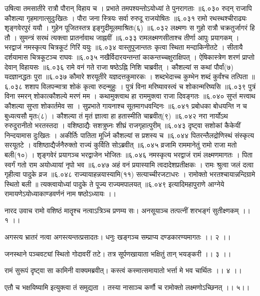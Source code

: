 उषित्वा तमसातीरे रात्रौ पौरान् विहाय च ।
प्रभाते तमपश्यन्तोऽयोध्यां ते पुनरागताः ॥६.०३०
रुदन् राजापि कौशल्या गृहमागात्सुदुःखितः ।
पौरा जना स्त्रियः सर्वा रुरुदू राजयोषितः ॥६.०३१
रामो रथस्थश्चीराढ्यः शृङ्गवेरपुरं ययौ ।
गुहेन पूजितस्तत्र इङ्गुदीमूलमाश्रितः(६) ॥६.०३२
लक्ष्मणः स गुहो रात्रौ चक्रतुर्जागरं हि तौ ।
सुमन्त्रं सरथं त्यक्त्वा प्रातर्नावाथ जाह्नवीं ॥६.०३३
रामलक्ष्मणसीताश्च तीर्णा आपुः प्रयागकम् ।
भरद्वाजं नमस्कृत्य चित्रकूटं गिरिं ययुः ॥६.०३४
वास्तुपूजान्ततः कृत्वा स्थिता मन्दाकिनीतटे ।
सीतायै दर्शयामास चित्रकूटञ्च राघवः ॥६.०३५
नखैर्विदारयन्तन्तां काकन्तच्चक्षुराक्षिपत् ।
ऐषिकास्त्रेण शरणं प्राप्तो देवान् विहायसः ॥६.०३६
रामे वनं गते राजा षष्ठेऽह्नि निशि चाब्रवीत् ।
कौशल्यां स कथां पौर्वां(७) यदज्ञानद्धतः पुरा ॥६.०३७
कौमारे शरयूतीरे यज्ञदत्तकुमारकः ।
शब्दभेदाच्च कुम्भेन शब्दं कुर्वंश्च तत्पिता ॥६.०३८
शशाप विलपन्मात्रा शोकं कृत्वा रुदन्मुहुः ।
पुत्रं विना मरिष्यावस्त्वं च शोकान्मरिष्यसि ॥६.०३९
पुत्रं विना स्मरन् शोकात्कौशल्ये मरणं मम ।
कथामुक्त्वाथ हा राममुक्त्वा राजा दिवङ्गतः ॥६.०४०
सुप्तं मत्त्वाथ कौशल्या सुप्ता शोकार्तमेव सा ।
सुप्रभाते गायनाश्च सूतमागधवन्दिनः ॥६.०४१
प्रबोधका बोधयन्ति न च बुध्यत्यसौ मृतः(८) ।
कौशल्या तं मृतं ज्ञात्वा हा हतास्मीति चाब्रवीत्(९) ॥६.०४२
नरा नार्योऽथ रुरुदुरानीतो भरतस्तदा ।
वशिष्ठाद्यैः सशत्रुघ्नः शीघ्रं राजगृहात्पुरीम् ॥६.०४३
दृष्ट्वा सशोकां कैकेयीं निन्दयामास दुःखितः ।
अकीर्तिः पातिता मूर्ध्नि कौशल्यां स प्रशस्य च ॥६.०४४
पितरन्तैलद्रोणिस्थं संस्कृत्य सरयूतटे ।
वशिष्ठाद्यैर्जनैरुक्तो राज्यं कुर्विति सोऽब्रवीत् ॥६.०४५
व्रजामि राममानेतुं रामो राजा मतो बली(१०) ।
शृङ्गवेरं प्रयागञ्च भरद्वाजेन भोजितः ॥६.०४६
नमस्कृत्य भरद्वाजं रामं लक्ष्मणमागतः ।
पिता स्वर्गं गतो राम अयोध्यायां नृपो भव ॥६.०४७
अहं वनं प्रयास्यामि त्वदादेशप्रतीक्षकः ।
रामः श्रुत्वा जलं दत्वा गृहीत्वा पादुके व्रज ॥६.०४८
राज्यायाहन्नयास्यामि(११) सत्याच्चीरजटाधरः ।
रामोक्तो भरतश्चायान्नन्दिग्रामे स्थितो बली ॥
त्यक्त्वायोध्यां पादुके ते पूज्य राज्यमपालयत् ॥६.०४९
इत्यादिमहापुराणे आग्नेये रामायणेऽयोध्याकाण्डवर्णनं नाम षष्ठोऽध्यायः ।।

नारद उवाच
रामो वशिष्ठं मातॄश्च नत्वाऽत्रिञ्च प्रणम्य सः।
अनसूयाञ्च तत्पत्नीं शरभङ्गं सुतीक्ष्णकम् ।। १ ।।

अगस्त्य भ्रातरं नत्वा अगस्त्यन्तत्प्रसादतः।
धनुः खङ्गञ्च सम्प्राप्य दण्डकारण्यमागतः ।। २ ।।

जनस्थाने पञ्चवट्यां स्थितो गोदावरीं तटे।
तत्र सूर्पणखायाता भक्षितुं तान् भयङ्करी ।। ३ ।।

रामं सुरूपं दृष्ट्वा सा कामिनी वाक्यमब्रवीत्।
कस्त्वं कस्मात्समायातो भर्त्ता मे भव चार्थितः ।। ४ ।।

एतौ च भक्षयिष्यामि इत्युक्त्वा तं समुद्यता ।
तस्या नासाञ्च कर्णौ च रामोक्तो लक्ष्मणोऽच्छिनत् ।। ५।।

